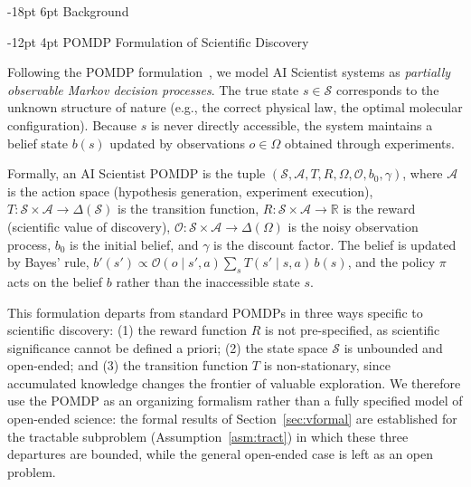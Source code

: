 \documentclass[11pt]{article}
\makeatletter
\renewcommand\section{\@startsection{section}{1}{\z@}%
  {-18pt \@plus -4pt \@minus -2pt}%
  {6pt \@plus 2pt}%
  {\normalfont\large\bfseries}}
\renewcommand\subsection{\@startsection{subsection}{2}{\z@}%
  {-12pt \@plus -2pt \@minus -2pt}%
  {4pt \@plus 1pt}%
  {\normalfont\normalsize\bfseries}}
\makeatother
\begin{document}
\section{Background}
\label{sec:background}

\subsection{POMDP Formulation of Scientific Discovery}

Following the POMDP formulation~\citep{kaelbling1998pomdp}, we model AI Scientist systems as \emph{partially observable Markov decision processes}. The true state $s \in \mathcal{S}$ corresponds to the unknown structure of nature (e.g., the correct physical law, the optimal molecular configuration). Because $s$ is never directly accessible, the system maintains a belief state $b(s)$ updated by observations $o \in \Omega$ obtained through experiments.
\par

Formally, an AI Scientist POMDP is the tuple $(\mathcal{S}, \mathcal{A}, T, R, \Omega, \mathcal{O}, b_0, \gamma)$, where $\mathcal{A}$ is the action space (hypothesis generation, experiment execution), $T: \mathcal{S} \times \mathcal{A} \rightarrow \Delta(\mathcal{S})$ is the transition function, $R: \mathcal{S} \times \mathcal{A} \rightarrow \mathbb{R}$ is the reward (scientific value of discovery), $\mathcal{O}: \mathcal{S} \times \mathcal{A} \rightarrow \Delta(\Omega)$ is the noisy observation process, $b_0$ is the initial belief, and $\gamma$ is the discount factor. The belief is updated by Bayes' rule, $b'(s') \propto \mathcal{O}(o \mid s', a) \sum_{s} T(s' \mid s, a)\, b(s)$, and the policy $\pi$ acts on the belief $b$ rather than the inaccessible state $s$.

This formulation departs from standard POMDPs in three ways specific to scientific discovery: (1) the reward function $R$ is not pre-specified, as scientific significance cannot be defined a priori; (2) the state space $\mathcal{S}$ is unbounded and open-ended; and (3) the transition function $T$ is non-stationary, since accumulated knowledge changes the frontier of valuable exploration. We therefore use the POMDP as an organizing formalism rather than a fully specified model of open-ended science: the formal results of Section~\ref{sec:vformal} are established for the tractable subproblem (Assumption~\ref{asm:tract}) in which these three departures are bounded, while the general open-ended case is left as an open problem.
\end{document}
